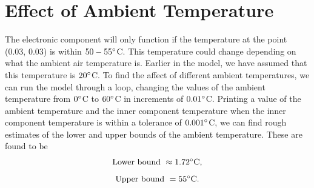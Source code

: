 \documentclass[12pt,a4paper]{article}
\begin{document}
\section{Effect of Ambient Temperature} 
The electronic component will only function if the temperature at the point (0.03, 0.03) is within $50-55\degree$C. This temperature could change depending on what the ambient air temperature is. Earlier in the model, we have assumed that this temperature is $20\degree$C. To find the affect of different ambient temperatures, we can run the model through a loop, changing the values of the ambient temperature from $0\degree$C to $60\degree$C in increments of $0.01\degree$C. Printing a value of the ambient temperature and the inner component temperature when the inner component temperature is within a tolerance of $0.001\degree$C, we can find rough estimates of the lower and upper bounds of the ambient temperature. These are found to be 
\[\text{Lower bound }\approx 1.72\degree\text{C},\]
\[\text{Upper bound }= 55\degree\text{C}.\]
\end{document}
